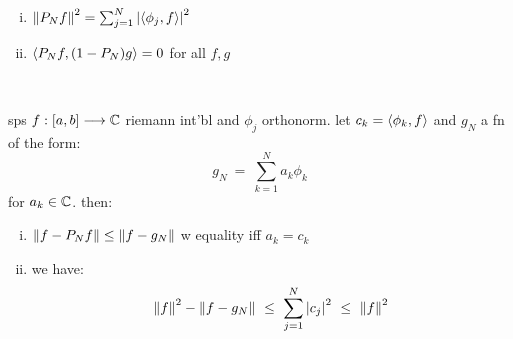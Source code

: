 \begin{crll} \vspace{-0.2in}
	\begin{enumerate}[i)]
		\item $\left\|P_{N}f\right\|^{2}=\sum_{j=1}^{N}\abs{\left\langle{\phi_{j},f}\right\rangle}^{2}$
		\item $\left\langle{P_{N}f,(1-P_{N})g}\right\rangle=0$ for all $f,g$
	\end{enumerate}
\end{crll} \

\begin{thm}
	sps $f:[a,b]\longrightarrow\mathbb{C}$ riemann int'bl and $\phi_{j}$ orthonorm.
	let $c_{k}=\left\langle{\phi_{k},f}\right\rangle$ and $g_{N}$ a fn of the form:
	\begin{equation*}
		g_{N} \ = \ \sum_{k=1}^{N}a_{k}\phi_{k}
	\end{equation*}
	for $a_{k}\in\mathbb{C}$. then:
	\begin{enumerate}[i)]
		\item $\left\|f-P_{N}f\right\|\leq\left\|f-g_{N}\right\|$ w equality iff $a_{k}=c_{k}$
		\item we have:
			\begin{equation*}
				\norm{f}^{2}-\norm{f-g_{N}}
				\ \leq \ \sum_{j=1}^{N}\abs{c_{j}}^{2} \ \leq \ \norm{f}^{2}
			\end{equation*}
	\end{enumerate}
\end{thm} \

